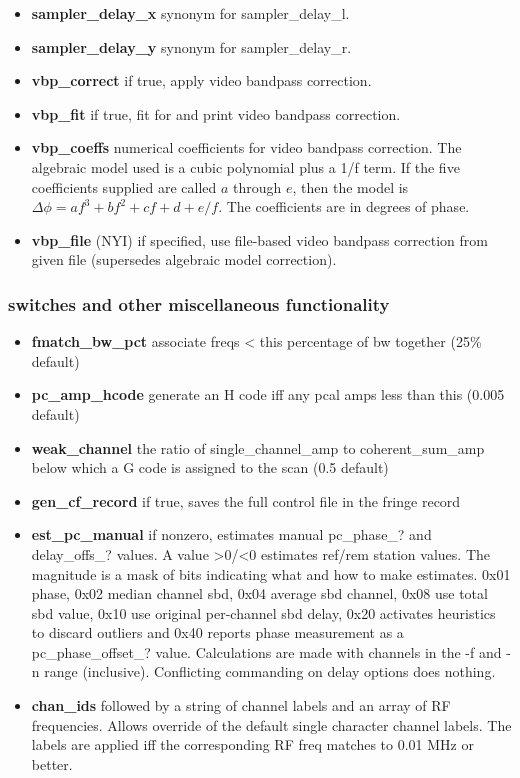 \begin{itemize}
\item[]\textbf{sampler\_delay\_x} synonym for sampler\_delay\_l.
\item[]\textbf{sampler\_delay\_y} synonym for sampler\_delay\_r.
\item[]\textbf{vbp\_correct} if true, apply video bandpass correction.
\item[]\textbf{vbp\_fit} if true, fit for and print video bandpass correction.
\item[]\textbf{vbp\_coeffs} numerical coefficients for video bandpass correction.
             The algebraic model used is a cubic polynomial plus a 1/f term. If the
             five coefficients supplied are called $a$ through $e$, then the model is
             $\Delta \phi = a f^3 + b f^2 + c f + d + e/f$. The coefficients are in
             degrees of phase.
     \item[]\textbf{vbp\_file} (NYI) if specified, use file-based video bandpass correction 
        from given file (supersedes algebraic model correction).
\end{itemize}

\subsubsection{switches and other miscellaneous functionality}
\begin{itemize}
\item[]\textbf{fmatch\_bw\_pct} associate freqs < this percentage of bw together (25\% default)
\item[]\textbf{pc\_amp\_hcode}  generate an H code iff any pcal amps less than this (0.005 default)
\item[]\textbf{weak\_channel}  the ratio of single\_channel\_amp to coherent\_sum\_amp 
                 below which a G code is assigned to the scan (0.5 default)
\item[]\textbf{gen\_cf\_record} if true,
    saves the full control file in the fringe record
\item[]\textbf{est\_pc\_manual} if nonzero, estimates manual
    pc\_phase\_? and delay\_offs\_?
    values. A value >0/<0 estimates ref/rem station values.
    The magnitude is a mask of bits indicating what and how
    to make estimates.  0x01 phase, 0x02 median channel sbd,
    0x04 average sbd channel, 0x08 use total sbd value,
    0x10 use original per-channel sbd delay, 0x20 activates
    heuristics to discard outliers and 0x40 reports phase
    measurement as a pc\_phase\_offset\_? value.  Calculations
    are made with channels in the -f and -n range (inclusive).
    Conflicting commanding on delay options does nothing.
\item[]\textbf{chan\_ids} followed by a string of channel labels
        and an array of RF frequencies. Allows override of the default single character 
    channel labels. The labels are applied iff the corresponding RF freq matches to 0.01 MHz or better.
\end{itemize}

